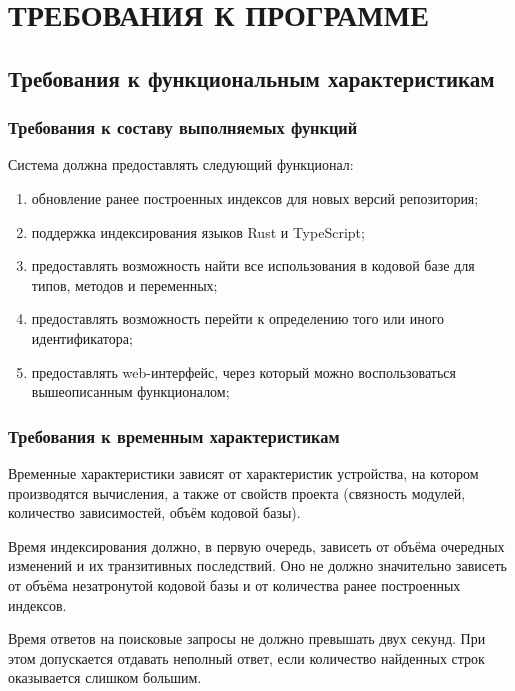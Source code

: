 \section{ТРЕБОВАНИЯ К ПРОГРАММЕ}
\label{requirements}

\subsection{Требования к функциональным характеристикам}
\label{requirements.features}
    \subsubsection{Требования к составу выполняемых функций}
        Система должна предоставлять следующий функционал:
        \begin{enumerate}[series=requirements]
        	\item обновление ранее построенных индексов для новых версий репозитория;
        	\item поддержка индексирования языков Rust и TypeScript;
        	\item предоставлять возможность найти все использования в кодовой базе для типов, методов и переменных;
        	\item предоставлять возможность перейти к определению того или иного идентификатора;
        	\item предоставлять web-интерфейс, через который можно воспользоваться вышеописанным функционалом;
        \end{enumerate}

    \subsubsection{Требования к временным характеристикам}
        Временные характеристики зависят от характеристик устройства, на котором производятся вычисления, а также от свойств проекта (связность модулей, количество зависимостей, объём кодовой базы).
        
        Время индексирования должно, в первую очередь, зависеть от объёма очередных изменений и их транзитивных последствий. Оно не должно значительно зависеть от объёма незатронутой кодовой базы и от количества ранее построенных индексов.

        Время ответов на поисковые запросы не должно превышать двух секунд. При этом допускается отдавать неполный ответ, если количество найденных строк оказывается слишком большим.

